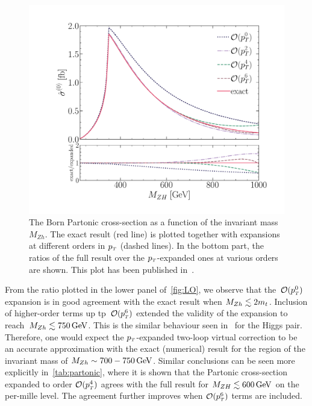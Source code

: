 \begin{figure}[t]
	\centering
	\includegraphics[width=0.8\linewidth]{./figures/LO_ptexp_ratio_1000.pdf}
	\caption{The Born Partonic cross-section
		as a function of the invariant mass $M_{Zh}$.
		The exact result (red line) is plotted together with expansions at
		different orders in $p_{\scriptscriptstyle T}$ (dashed lines). In the bottom part,
		the ratios of the full result over the $p_{\scriptscriptstyle T}$-expanded ones at
		various orders are shown. This plot has been published in~\cite{Alasfar:2021ppe}.}
	\label{fig:LO}
\end{figure}
From the ratio plotted in the lower panel of~\autoref{fig:LO}, we observe that the~$\mathcal{O}(p_{\scriptscriptstyle T}^0)$ expansion is in good agreement with the exact result when $M_{Zh}\lesssim 2m_t$. Inclusion of higher-order terms up tp~$\mathcal{O}(p_{\scriptscriptstyle T}^6)$ extended the validity of the expansion to reach~$M_{Zh}\lesssim 750\,\textrm{GeV}$. This is the similar behaviour seen in~\cite{Bonciani:2018omm} for the Higgs pair.  Therefore, one would expect the $p_{\scriptscriptstyle T}$-expanded two-loop virtual correction to be an accurate approximation with the exact (numerical) result for the region of the invariant mass of  $M_{Zh}\sim 700-750\,\textrm{GeV}$. 
Similar conclusions can be seen more explicitly in~\autoref{tab:partonic}, where it is shown that the Partonic cross-section
expanded to order $\mathcal{O}(p_{\scriptscriptstyle T}^4)$ agrees with the full result for
$M_{ZH} \lesssim 600 \,\textrm{GeV}$  on the per-mille level.
The agreement further improves when $\mathcal{O}(p_{\scriptscriptstyle T}^6)$ terms are included.
